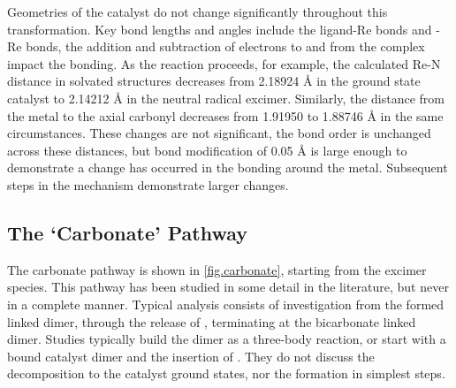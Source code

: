 


Geometries of the catalyst do not change significantly throughout this transformation. Key bond lengths and angles include the ligand-Re bonds and -Re bonds, the addition and subtraction of electrons to and from the complex impact the bonding. As the reaction proceeds, for example, the calculated Re-N distance in solvated structures decreases from 2.18924 \r{A} in the ground state catalyst to 2.14212 \r{A} in the neutral radical excimer. Similarly, the distance from the metal to the axial carbonyl decreases from 1.91950 to 1.88746 \r{A} in the same circumstances. These changes are not significant, the bond order is unchanged across these distances, but bond modification of 0.05 \r{A} is large enough to demonstrate a change has occurred in the bonding around the metal. Subsequent steps in the mechanism demonstrate larger changes.

\subsection{The `Carbonate' Pathway}\label{ss.carbonate}

The carbonate pathway is shown in \autoref{fig.carbonate}, starting from the excimer species. This pathway has been studied in some detail in the literature, but never in a complete manner. Typical analysis consists of investigation from the formed  linked dimer, through the release of , terminating at the bicarbonate linked dimer. Studies typically build the dimer as a three-body reaction, or start with a  bound catalyst dimer and the insertion of . They do not discuss the decomposition to the catalyst ground states, nor the formation in simplest steps.

